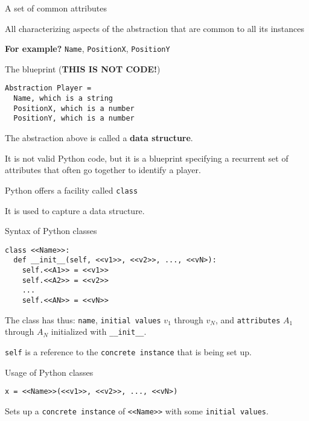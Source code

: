 \documentclass{beamer}
\begin{document}
\begin{slide}{
\item A set of common attributes
\item All characterizing aspects of the abstraction that are common to all its instances
\item \textbf{For example?} \pause \texttt{Name}, \texttt{PositionX}, \texttt{PositionY}
}\end{slide}

\begin{frame}[fragile]{The blueprint (\textbf{THIS IS NOT CODE!})}
\begin{lstlisting}
Abstraction Player =
  Name, which is a string
  PositionX, which is a number
  PositionY, which is a number
\end{lstlisting}

The abstraction above is called a \textbf{data structure}.

It is not valid Python code, but it is a blueprint specifying a recurrent set of attributes that often go together to identify a player.

\end{frame}

\begin{slide}{
\item Python offers a facility called \texttt{class}
\item It is used to capture a data structure.
}\end{slide}

\begin{frame}[fragile]{Syntax of Python classes}
\begin{lstlisting}
class <<Name>>:
  def __init__(self, <<v1>>, <<v2>>, ..., <<vN>):
    self.<<A1>> = <<v1>>
    self.<<A2>> = <<v2>>
    ...
    self.<<AN>> = <<vN>>
\end{lstlisting}

The class has thus: \texttt{name}, \texttt{initial values} $v_1$ through $v_N$, and \texttt{attributes} $A_1$ through $A_N$ initialized with \texttt{\_\_init\_\_}.

\texttt{self} is a reference to the \texttt{concrete instance} that is being set up.
\end{frame}

\begin{frame}[fragile]{Usage of Python classes}
\begin{lstlisting}
x = <<Name>>(<<v1>>, <<v2>>, ..., <<vN>)
\end{lstlisting}

Sets up a \texttt{concrete instance} of \texttt{<<Name>>} with some \texttt{initial values}.
\end{frame}
\end{document}
